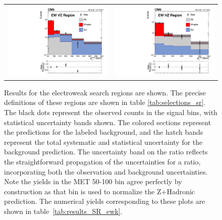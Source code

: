     \begin{figure}[!h]
      \centering
      \begin{tabular}{cc}
        \includegraphics[width=0.4\linewidth]{figures/results/h_met_SR_tcwz.pdf} &
        \includegraphics[width=0.4\linewidth]{figures/results/h_met_SR_tchz.pdf} \\
      \end{tabular}
      \caption[Results for the electroweak search regions are shown. The precise definitions of these regions are shown in table \ref{tab:selections_sr}.]{Results for the electroweak search regions are shown. The precise definitions of these regions are shown in table \ref{tab:selections_sr}.  The black dots represent the observed counts in the signal bins, with statistical uncertainty bands shown. The colored sections represent the predictions for the labeled background, and the hatch bands represent the total systematic and statistical uncertainty for the background prediction. The uncertainty band on the ratio reflects the straightforward propagation of the uncertainties for a ratio, incorporating both the observation and background uncertainties. Note the yields in the MET 50-100 bin agree perfectly by construction as that bin is used to normalize the Z+Hadronic prediction. The numerical yields corresponding to these plots are shown in table~\ref{tab:results_SR_ewk}. \label{fig:results_SR_ewk}
      }
    \end{figure}

